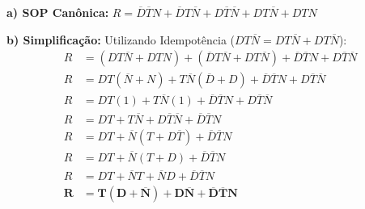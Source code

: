 \documentclass[12pt]{article}
\begin{document}
\begin{solucao}
\textbf{a) SOP Canônica:}
$R = \overline{D}\overline{T}N + \overline{D}T\overline{N} + D\overline{T}\overline{N} + DT\overline{N} + DTN$

\textbf{b) Simplificação:}
Utilizando Idempotência ($DT\overline{N} = DT\overline{N} + DT\overline{N}$):
\begin{align*}
    R &= (DT\overline{N} + DTN) + (\overline{D}T\overline{N} + DT\overline{N}) + \overline{D}\overline{T}N + D\overline{T}\overline{N} \\
    R &= DT(\overline{N} + N) + T\overline{N}(\overline{D} + D) + \overline{D}\overline{T}N + D\overline{T}\overline{N} \\
    R &= DT(1) + T\overline{N}(1) + \overline{D}\overline{T}N + D\overline{T}\overline{N} \\
    R &= DT + T\overline{N} + D\overline{T}\overline{N} + \overline{D}\overline{T}N \\
    R &= DT + \overline{N}(T + D\overline{T}) + \overline{D}\overline{T}N \\
    R &= DT + \overline{N}(T + D) + \overline{D}\overline{T}N \\
    R &= DT + \overline{N}T + \overline{N}D + \overline{D}\overline{T}N \\
    \mathbf{R} &= \mathbf{T(D + \overline{N}) + D\overline{N} + \overline{D}\overline{T}N}
\end{align*}
\end{solucao}
\end{document}

